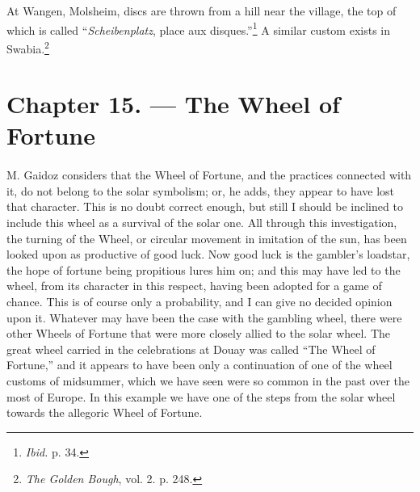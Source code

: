 \documentclass[a4paper, 11pt, oneside, polutonikogreek, english]{article}
\begin{document}
At Wangen, Molsheim, discs are thrown from a hill near the village, the top of which is called ``\emph{Scheibenplatz}, place aux disques.''\footnote{\emph{Ibid.} p. 34.} A similar custom exists in Swabia.\footnote{\emph{The Golden Bough}, vol. 2. p. 248.}
\clearpage
\section{Chapter 15. --- The Wheel of Fortune}
\paragraph{}
M. Gaidoz considers that the Wheel of Fortune, and the practices connected with it, do not belong to the solar symbolism; or, he adds, they appear to have lost that character. This is no doubt correct enough, but still I should be inclined to include this wheel as a survival of the solar one. All through this investigation, the turning of the Wheel, or circular movement in imitation of the sun, has been looked upon as productive of good luck. Now good luck is the gambler's loadstar, the hope of fortune being propitious lures him on; and this may have led to the wheel, from its character in this respect, having been adopted for a game of chance. This is of course only a probability, and I can give no decided opinion upon it. Whatever may have been the case with the gambling wheel, there were other Wheels of Fortune that were more closely allied to the solar wheel. The great wheel carried in the celebrations at Douay was called ``The Wheel of Fortune,'' and it appears to have been only a continuation of one of the wheel customs of midsummer, which we have seen were so common in the past over the most of Europe. In this example we have one of the steps from the solar wheel towards the allegoric Wheel of Fortune.
\end{document}
